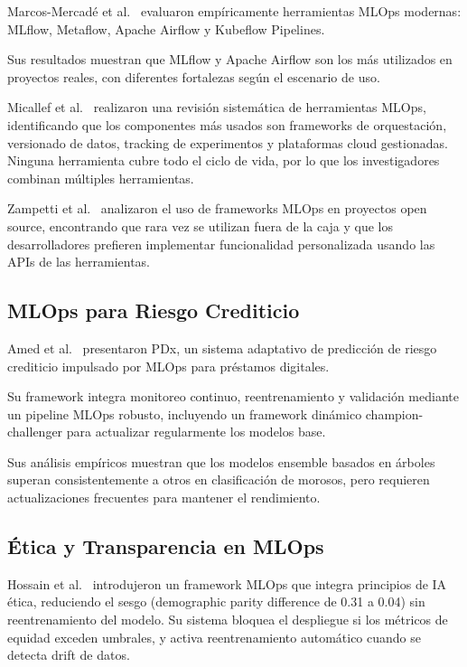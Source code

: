 Marcos-Mercadé et al.~\cite{marcos2026empirical} evaluaron empíricamente herramientas MLOps modernas: MLflow, Metaflow, Apache Airflow y Kubeflow Pipelines.

Sus resultados muestran que MLflow y Apache Airflow son los más utilizados en proyectos reales, con diferentes fortalezas según el escenario de uso.

Micallef et al.~\cite{micallef2026systematic} realizaron una revisión sistemática de herramientas MLOps, identificando que los componentes más usados son frameworks de orquestación, versionado de datos, tracking de experimentos y plataformas cloud gestionadas. Ninguna herramienta cubre todo el ciclo de vida, por lo que los investigadores combinan múltiples herramientas.

Zampetti et al.~\cite{zampetti2026how} analizaron el uso de frameworks MLOps en proyectos open source, encontrando que rara vez se utilizan fuera de la caja y que los desarrolladores prefieren implementar funcionalidad personalizada usando las APIs de las herramientas.

\subsection{MLOps para Riesgo Crediticio}

Amed et al.~\cite{amed2025pdx} presentaron PDx, un sistema adaptativo de predicción
de riesgo crediticio impulsado por MLOps para préstamos digitales. 

Su framework integra monitoreo continuo, reentrenamiento y validación mediante un pipeline MLOps robusto, incluyendo un framework dinámico champion-challenger para actualizar regularmente los modelos base. 

Sus análisis empíricos muestran que los modelos ensemble basados en árboles superan consistentemente a otros en clasificación de morosos, pero requieren actualizaciones frecuentes para mantener el rendimiento.

\subsection{Ética y Transparencia en MLOps}

Hossain et al.~\cite{hossain2026ethical} introdujeron un framework MLOps que integra principios de IA ética, reduciendo el sesgo (demographic parity difference de 0.31 a 0.04) sin reentrenamiento del modelo. Su sistema bloquea el despliegue si los métricos de equidad exceden umbrales, y activa reentrenamiento automático cuando se detecta drift de datos.


